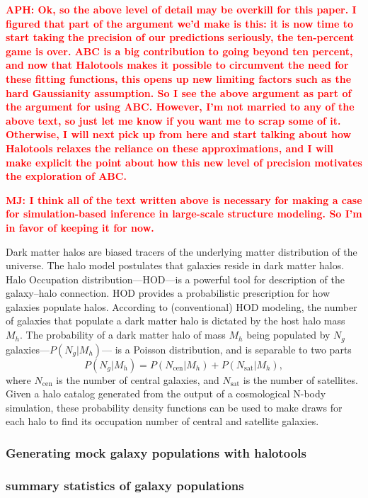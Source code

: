 \documentclass[12pt, preprint]{aastex}
\newcommand{\todo}[1]{{\bf \textcolor{red}{ #1}}}
\newcommand{\beq}{\begin{equation}}
\newcommand{\eeq}{\end{equation}}
\begin{document}
\todo{APH: Ok, so the above level of detail may be overkill for this paper. I figured that part of the argument we'd make is this: it is now time to start taking the precision of our predictions seriously, the ten-percent game is over. ABC is a big contribution to going beyond ten percent, and now that Halotools makes it possible to circumvent the need for these fitting functions, this opens up new limiting factors such as the hard Gaussianity assumption. So I see the above argument as part of the argument for using ABC. However, I'm not married to any of the above text, so just let me know if you want me to scrap some of it. Otherwise, I will next pick up from here and start talking about how Halotools relaxes the reliance on these approximations, and I will make explicit the point about how this new level of precision motivates the exploration of ABC.}

\todo{MJ: I think all of the text written above is necessary for making a case for simulation-based inference in large-scale structure modeling. So I'm in favor of keeping it for now.}


Dark matter halos are biased tracers of the underlying matter distribution of the universe. The halo model postulates that galaxies reside in dark matter halos. Halo Occupation distribution---HOD---is a powerful tool for description of the galaxy--halo connection. HOD provides a probabilistic prescription for how galaxies populate halos. According to (conventional) HOD modeling, the number of galaxies that populate a dark matter halo is dictated by the host halo mass $M_h$. The probability of a dark matter halo of mass $M_h$ being populated by $N_g$ galaxies---$P(N_g|M_h)$--- is a Poisson distribution, and is separable to two parts 
\beq
P(N_g|M_h) = P(N_\mathrm{cen}|M_h) + P(N_\mathrm{sat}|M_h),
\eeq
where $N_\mathrm{cen}$ is the number of central galaxies, and $N_\mathrm{sat}$ is the number of satellites. Given a halo catalog generated from the output of a cosmological N-body simulation, these probability density functions can be used to make draws for each halo to find its occupation number of central and satellite galaxies.

\subsubsection{Generating mock galaxy populations with halotools}

\subsubsection{summary statistics of galaxy populations}
\end{document}
